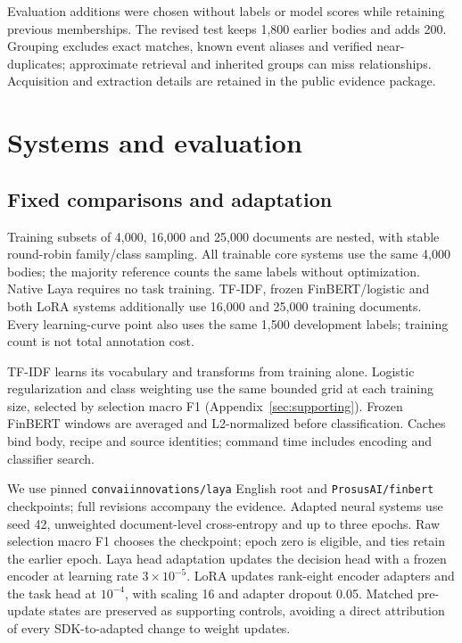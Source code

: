 \documentclass[11pt,a4paper]{article}
\begin{document}
Evaluation additions were chosen without labels or model scores while retaining
previous memberships. The revised test keeps 1,800 earlier bodies and adds 200.
Grouping excludes exact matches, known event aliases and verified near-duplicates;
approximate retrieval and inherited groups can miss relationships. Acquisition
and extraction details are retained in the public evidence package.



\section{Systems and evaluation}
\label{sec:methods}
\subsection{Fixed comparisons and adaptation}
Training subsets of 4,000, 16,000 and 25,000 documents are nested, with stable
round-robin family/class sampling. All trainable core systems use the same
4,000 bodies; the majority reference counts the same labels without optimization. Native Laya
requires no task training. TF-IDF, frozen FinBERT/logistic and both LoRA systems
additionally use 16,000 and 25,000 training documents. Every learning-curve point also
uses the same 1,500 development labels; training count is not total annotation cost.

TF-IDF learns its vocabulary and transforms from training alone. Logistic
regularization and class weighting use the same bounded grid at each training
size, selected by selection macro F1 (Appendix~\ref{sec:supporting}).
Frozen FinBERT windows are averaged and L2-normalized before classification.
Caches bind body, recipe and source identities; command time includes encoding
and classifier search.

We use pinned \texttt{convaiinnovations/laya} English root and
\texttt{ProsusAI/finbert} checkpoints; full revisions accompany the evidence.
Adapted neural systems use seed 42, unweighted document-level cross-entropy and
up to three epochs. Raw selection macro F1 chooses the checkpoint; epoch zero
is eligible, and ties retain the earlier epoch. Laya head adaptation updates
the decision head with a frozen encoder at learning rate $3\times10^{-5}$.
LoRA updates rank-eight encoder adapters and the task head at $10^{-4}$, with
scaling 16 and adapter dropout 0.05. Matched pre-update states are preserved
as supporting controls, avoiding a direct attribution of every SDK-to-adapted
change to weight updates.
\end{document}

